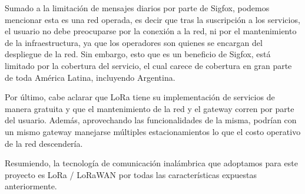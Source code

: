Sumado a la limitación de mensajes diarios por parte de Sigfox, podemos mencionar esta es una red operada, es decir que tras la suscripción a los servicios, el usuario no debe preocuparse por la conexión a la red, ni por el mantenimiento de la infraestructura, ya que los operadores son quienes se encargan del despliegue de la red. Sin embargo, esto que es un beneficio de Sigfox, está limitado por la cobertura del servicio, el cual carece de cobertura en gran parte de toda América Latina, incluyendo Argentina. 

Por último, cabe aclarar que LoRa tiene su implementación de servicios de manera gratuita y que el mantenimiento de la red y el gateway corren por parte del usuario. Además, aprovechando las funcionalidades de la misma, podrían con un mismo gateway manejarse múltiples estacionamientos lo que el costo operativo de la red descendería. 

Resumiendo, la tecnología de comunicación inalámbrica que adoptamos para este proyecto es LoRa / LoRaWAN por todas las características expuestas anteriormente. 

